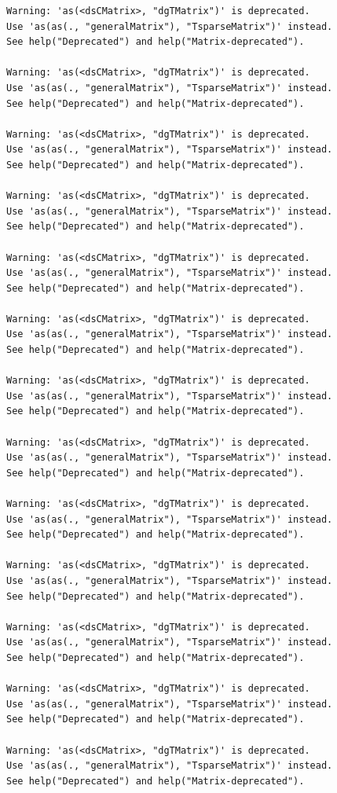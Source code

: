 \documentclass[
]{book}
\begin{document}
\begin{verbatim}
Warning: 'as(<dsCMatrix>, "dgTMatrix")' is deprecated.
Use 'as(as(., "generalMatrix"), "TsparseMatrix")' instead.
See help("Deprecated") and help("Matrix-deprecated").

Warning: 'as(<dsCMatrix>, "dgTMatrix")' is deprecated.
Use 'as(as(., "generalMatrix"), "TsparseMatrix")' instead.
See help("Deprecated") and help("Matrix-deprecated").

Warning: 'as(<dsCMatrix>, "dgTMatrix")' is deprecated.
Use 'as(as(., "generalMatrix"), "TsparseMatrix")' instead.
See help("Deprecated") and help("Matrix-deprecated").

Warning: 'as(<dsCMatrix>, "dgTMatrix")' is deprecated.
Use 'as(as(., "generalMatrix"), "TsparseMatrix")' instead.
See help("Deprecated") and help("Matrix-deprecated").

Warning: 'as(<dsCMatrix>, "dgTMatrix")' is deprecated.
Use 'as(as(., "generalMatrix"), "TsparseMatrix")' instead.
See help("Deprecated") and help("Matrix-deprecated").

Warning: 'as(<dsCMatrix>, "dgTMatrix")' is deprecated.
Use 'as(as(., "generalMatrix"), "TsparseMatrix")' instead.
See help("Deprecated") and help("Matrix-deprecated").

Warning: 'as(<dsCMatrix>, "dgTMatrix")' is deprecated.
Use 'as(as(., "generalMatrix"), "TsparseMatrix")' instead.
See help("Deprecated") and help("Matrix-deprecated").

Warning: 'as(<dsCMatrix>, "dgTMatrix")' is deprecated.
Use 'as(as(., "generalMatrix"), "TsparseMatrix")' instead.
See help("Deprecated") and help("Matrix-deprecated").

Warning: 'as(<dsCMatrix>, "dgTMatrix")' is deprecated.
Use 'as(as(., "generalMatrix"), "TsparseMatrix")' instead.
See help("Deprecated") and help("Matrix-deprecated").

Warning: 'as(<dsCMatrix>, "dgTMatrix")' is deprecated.
Use 'as(as(., "generalMatrix"), "TsparseMatrix")' instead.
See help("Deprecated") and help("Matrix-deprecated").

Warning: 'as(<dsCMatrix>, "dgTMatrix")' is deprecated.
Use 'as(as(., "generalMatrix"), "TsparseMatrix")' instead.
See help("Deprecated") and help("Matrix-deprecated").

Warning: 'as(<dsCMatrix>, "dgTMatrix")' is deprecated.
Use 'as(as(., "generalMatrix"), "TsparseMatrix")' instead.
See help("Deprecated") and help("Matrix-deprecated").

Warning: 'as(<dsCMatrix>, "dgTMatrix")' is deprecated.
Use 'as(as(., "generalMatrix"), "TsparseMatrix")' instead.
See help("Deprecated") and help("Matrix-deprecated").


\end{verbatim}
\end{document}
